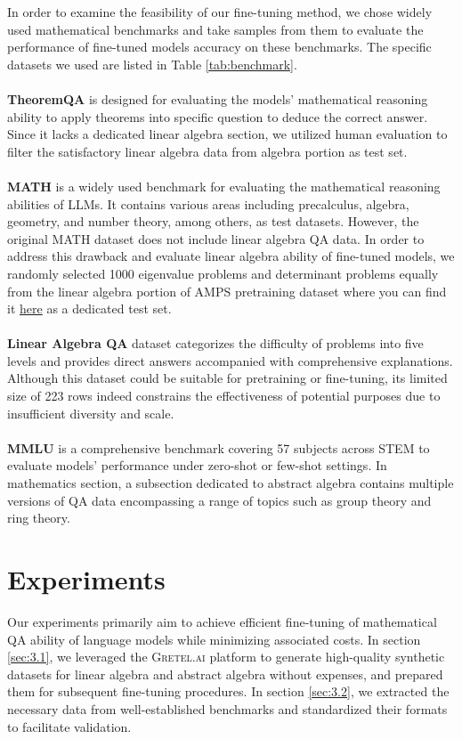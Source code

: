 \documentclass[10pt]{article}
\begin{document}
 
In order to examine the feasibility of our fine-tuning method, we chose widely used mathematical benchmarks and take samples from them to evaluate the performance of fine-tuned models accuracy on these benchmarks. The specific datasets we used are listed in Table \ref{tab:benchmark}.\\
\\
\textbf{TheoremQA} \cite{Chen2023TheoremQAAT} is designed for evaluating the models' mathematical reasoning ability to apply theorems into specific question to deduce the correct answer. Since it lacks a dedicated linear algebra section, we utilized human evaluation to filter the satisfactory linear algebra data from algebra portion as test set. \\
\\
\textbf{MATH} \cite{hendrycksmath2021} is a widely used benchmark for evaluating the mathematical reasoning abilities of LLMs. It contains various areas including precalculus, algebra, geometry, and number theory, among others, as test datasets. However, the original MATH dataset does not include linear algebra QA data. In order to address this drawback and evaluate linear algebra ability of fine-tuned models, we randomly selected 1000 eigenvalue problems and determinant problems equally from the linear algebra portion of AMPS pretraining dataset where you can find it {\href{https://drive.google.com/file/d/1hQsua3TkpEmcJD_UWQx8dmNdEZPyxw23/view?usp=sharing}{here}} as a dedicated test set.\\
\\
\textbf{Linear Algebra QA} \cite{Likhi2003_linearalgebra_QA} dataset categorizes the difficulty of problems into five levels and provides direct answers accompanied with comprehensive explanations. Although this dataset could be suitable for pretraining or fine-tuning, its limited size of 223 rows indeed constrains the effectiveness of potential purposes due to insufficient diversity and scale.\\ 
\\
\textbf{MMLU} \cite{hendrycks2021ethics} is a comprehensive benchmark covering 57 subjects across STEM to evaluate models' performance under zero-shot or few-shot settings. In mathematics section, a subsection dedicated to abstract algebra contains multiple versions of QA data encompassing a range of topics such as group theory and ring theory.  

\section{Experiments}
Our experiments primarily aim to achieve efficient fine-tuning of mathematical QA ability of language models while minimizing associated costs. In section \ref{sec:3.1}, we leveraged the \textsc{Gretel.ai} platform to generate high-quality synthetic datasets for linear algebra and abstract algebra without expenses, and prepared them for subsequent fine-tuning procedures. In section \ref{sec:3.2}, we extracted the necessary data from well-established benchmarks and standardized their formats to facilitate validation.
\end{document}

